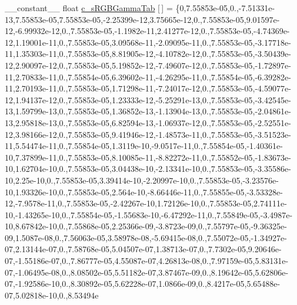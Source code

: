 \begin{DoxyCompactItemize}
\-\_\-\-\_\-constant\-\_\-\-\_\- float \hyperlink{namespacecv_1_1gpu_1_1device_1_1color__detail_aedc1606afa266d7fb032dc5fe2313262}{c\-\_\-s\-R\-G\-B\-Gamma\-Tab} \mbox{[}$\,$\mbox{]} = \{0,7.\-55853e-\/05,0.,-\/7.\-51331e-\/13,7.\-55853e-\/05,7.\-55853e-\/05,-\/2.\-25399e-\/12,3.\-75665e-\/12,0.,7.\-55853e-\/05,9.\-01597e-\/12,-\/6.\-99932e-\/12,0.,7.\-55853e-\/05,-\/1.\-1982e-\/11,2.\-41277e-\/12,0.,7.\-55853e-\/05,-\/4.\-74369e-\/12,1.\-19001e-\/11,0.,7.\-55853e-\/05,3.\-09568e-\/11,-\/2.\-09095e-\/11,0.,7.\-55853e-\/05,-\/3.\-17718e-\/11,1.\-35303e-\/11,0.,7.\-55853e-\/05,8.\-81905e-\/12,-\/4.\-10782e-\/12,0.,7.\-55853e-\/05,-\/3.\-50439e-\/12,2.\-90097e-\/12,0.,7.\-55853e-\/05,5.\-19852e-\/12,-\/7.\-49607e-\/12,0.,7.\-55853e-\/05,-\/1.\-72897e-\/11,2.\-70833e-\/11,0.,7.\-55854e-\/05,6.\-39602e-\/11,-\/4.\-26295e-\/11,0.,7.\-55854e-\/05,-\/6.\-39282e-\/11,2.\-70193e-\/11,0.,7.\-55853e-\/05,1.\-71298e-\/11,-\/7.\-24017e-\/12,0.,7.\-55853e-\/05,-\/4.\-59077e-\/12,1.\-94137e-\/12,0.,7.\-55853e-\/05,1.\-23333e-\/12,-\/5.\-25291e-\/13,0.,7.\-55853e-\/05,-\/3.\-42545e-\/13,1.\-59799e-\/13,0.,7.\-55853e-\/05,1.\-36852e-\/13,-\/1.\-13904e-\/13,0.,7.\-55853e-\/05,-\/2.\-04861e-\/13,2.\-95818e-\/13,0.,7.\-55853e-\/05,6.\-82594e-\/13,-\/1.\-06937e-\/12,0.,7.\-55853e-\/05,-\/2.\-52551e-\/12,3.\-98166e-\/12,0.,7.\-55853e-\/05,9.\-41946e-\/12,-\/1.\-48573e-\/11,0.,7.\-55853e-\/05,-\/3.\-51523e-\/11,5.\-54474e-\/11,0.,7.\-55854e-\/05,1.\-3119e-\/10,-\/9.\-0517e-\/11,0.,7.\-55854e-\/05,-\/1.\-40361e-\/10,7.\-37899e-\/11,0.,7.\-55853e-\/05,8.\-10085e-\/11,-\/8.\-82272e-\/11,0.,7.\-55852e-\/05,-\/1.\-83673e-\/10,1.\-62704e-\/10,0.,7.\-55853e-\/05,3.\-04438e-\/10,-\/2.\-13341e-\/10,0.,7.\-55853e-\/05,-\/3.\-35586e-\/10,2.\-25e-\/10,0.,7.\-55853e-\/05,3.\-39414e-\/10,-\/2.\-20997e-\/10,0.,7.\-55853e-\/05,-\/3.\-23576e-\/10,1.\-93326e-\/10,0.,7.\-55853e-\/05,2.\-564e-\/10,-\/8.\-66446e-\/11,0.,7.\-55855e-\/05,-\/3.\-53328e-\/12,-\/7.\-9578e-\/11,0.,7.\-55853e-\/05,-\/2.\-42267e-\/10,1.\-72126e-\/10,0.,7.\-55853e-\/05,2.\-74111e-\/10,-\/1.\-43265e-\/10,0.,7.\-55854e-\/05,-\/1.\-55683e-\/10,-\/6.\-47292e-\/11,0.,7.\-55849e-\/05,-\/3.\-4987e-\/10,8.\-67842e-\/10,0.,7.\-55868e-\/05,2.\-25366e-\/09,-\/3.\-8723e-\/09,0.,7.\-55797e-\/05,-\/9.\-36325e-\/09,1.\-5087e-\/08,0.,7.\-56063e-\/05,3.\-58978e-\/08,-\/5.\-69415e-\/08,0.,7.\-55072e-\/05,-\/1.\-34927e-\/07,2.\-13144e-\/07,0.,7.\-58768e-\/05,5.\-04507e-\/07,1.\-38713e-\/07,0.,7.\-7302e-\/05,9.\-20646e-\/07,-\/1.\-55186e-\/07,0.,7.\-86777e-\/05,4.\-55087e-\/07,4.\-26813e-\/08,0.,7.\-97159e-\/05,5.\-83131e-\/07,-\/1.\-06495e-\/08,0.,8.\-08502e-\/05,5.\-51182e-\/07,3.\-87467e-\/09,0.,8.\-19642e-\/05,5.\-62806e-\/07,-\/1.\-92586e-\/10,0.,8.\-30892e-\/05,5.\-62228e-\/07,1.\-0866e-\/09,0.,8.\-4217e-\/05,5.\-65488e-\/07,5.\-02818e-\/10,0.,8.\-53494e
\end{DoxyCompactItemize}
